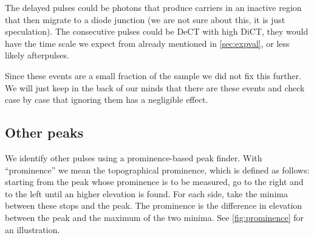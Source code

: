 \begin{table}
    
    
    
\end{table}

The delayed pulses could be photons that produce carriers in an inactive region
that then migrate to a diode junction (we are not sure about this, it is just
speculation). The consecutive pulses could be DeCT with high DiCT, they would
have the time scale we expect from \cite[fig.~3.8~p.~54]{savarese2018}
already mentioned in \autoref{sec:expval}, or less likely afterpulses.

Since these events are a small fraction of the sample we did not fix this
further. We will just keep in the back of our minds that there are these events
and check case by case that ignoring them has a negligible effect.

\subsection{Other peaks}

We identify other pulses using a prominence-based peak finder. With
``prominence'' we mean the topographical prominence, which is defined as
follows: starting from the peak whose prominence is to be measured, go to the
right and to the left until an higher elevation is found. For each side, take
the minima between these stops and the peak. The prominence is the difference
in elevation between the peak and the maximum of the two minima. See
\autoref{fig:prominence} for an illustration.

